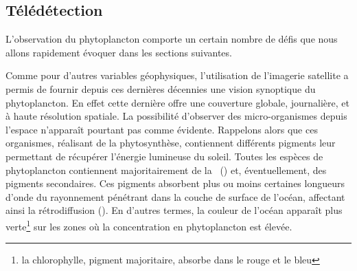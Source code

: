 
\begin{figure}
  \centering
  \label{fig:pompe-bio}
\end{figure}

\subsection{Télédétection}
\label{sec:teledetection}

L'observation du phytoplancton comporte un certain nombre de défis que nous allons rapidement évoquer dans les sections suivantes.

Comme pour d'autres variables géophysiques, l'utilisation de l'imagerie satellite a permis de fournir depuis ces dernières décennies une vision synoptique du phytoplancton.
En effet cette dernière offre une couverture globale, journalière, et à haute résolution spatiale.
La possibilité d'observer des micro-organismes depuis l'espace n'apparaît pourtant pas comme évidente.
Rappelons alors que ces organismes, réalisant de la phytosynthèse, contiennent différents pigments leur permettant de récupérer l'énergie lumineuse du soleil.
Toutes les espèces de phytoplancton contiennent majoritairement de la ~() et, éventuellement, des pigments secondaires.
Ces pigments absorbent plus ou moins certaines longueurs d'onde du rayonnement pénétrant dans la couche de surface de l'océan, affectant ainsi la rétrodiffusion ().
En d'autres termes, la couleur de l'océan apparaît plus verte\footnote{%
  la chlorophylle, pigment majoritaire, absorbe dans le rouge et le bleu}
sur les zones où la concentration en phytoplancton est élevée.

